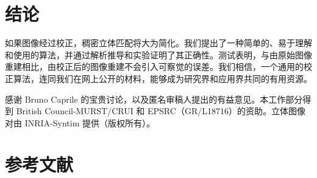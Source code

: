 \documentclass[a4paper,twocolumn,zihao=5,fontset=none,UTF8]{ctexart}
\begin{document}
\section{结论}

如果图像经过校正，稠密立体匹配将大为简化。我们提出了一种简单的、易于理解和使用的算法，并通过解析推导和实验证明了其正确性。测试表明，与由原始图像重建相比，由校正后的图像重建不会引入可察觉的误差。我们相信，一个通用的校正算法，连同我们在网上公开的材料，能够成为研究界和应用界共同的有用资源。

\vspace{0.5em}
\quad 感谢 Bruno Caprile 的宝贵讨论，以及匿名审稿人提出的有益意见。本工作部分得到 British Council-MURST/CRUI 和 EPSRC（GR/L18716）的资助。立体图像对由 INRIA-Syntim 提供（版权所有）。

\section*{参考文献}
\begingroup
\small
\end{document}
